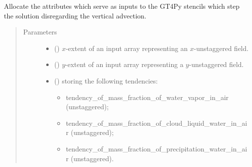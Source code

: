 \documentclass[letterpaper,10pt,english]{sphinxmanual}
\begin{document}
\begin{fulllineitems}
\begin{fulllineitems}
\end{fulllineitems}


\begin{fulllineitems}
\label{\detokenize{api:dycore.prognostic_isentropic.PrognosticIsentropic._stencils_stepping_by_neglecting_vertical_advection_allocate_inputs}}
Allocate the attributes which serve as inputs to the GT4Py stencils which step the solution
disregarding the vertical advection.
\begin{quote}\begin{description}
\item[{Parameters}] \leavevmode\begin{itemize}
\item {} 
 () \textendash{} \(x\)-extent of an input array representing an \(x\)-unstaggered field.

\item {} 
 () \textendash{} \(y\)-extent of an input array representing a \(y\)-unstaggered field.

\item {} 
 () \textendash{} 
{\hyperref[\detokenize{api:storages.grid_data.GridData}]{}} storing the following tendencies:
\begin{itemize}
\item {} 
tendency\_of\_mass\_fraction\_of\_water\_vapor\_in\_air (unstaggered);

\item {} 
tendency\_of\_mass\_fraction\_of\_cloud\_liquid\_water\_in\_air (unstaggered);

\item {} 
tendency\_of\_mass\_fraction\_of\_precipitation\_water\_in\_air (unstaggered).

\end{itemize}


\end{itemize}

\end{description}\end{quote}


\end{fulllineitems}
\end{fulllineitems}
\end{document}
